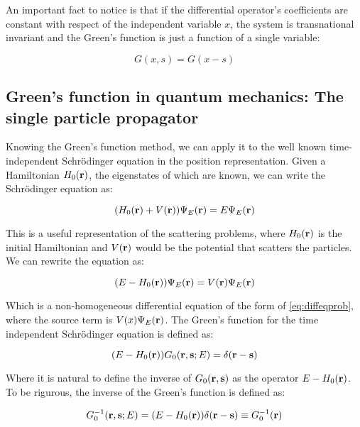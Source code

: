 An important fact to notice is that if the differential operator's coefficients are constant with respect of the independent variable $x$, the system is transnational invariant and the Green's function is just a function of a single variable:

\begin{equation}
    G(x,s)=G(x-s)
\end{equation}

\subsection{Green's function in quantum mechanics: The single particle propagator}

Knowing the Green's function method, we can apply it to the well known time-independent Schrödinger equation in the position representation. Given a Hamiltonian $H_0(\vb r)$, the eigenstates of which are known, we can write the Schrödinger equation as:

\begin{equation}
    \qty(H_0(\vb r)+V(\vb r)){\Psi_E(\vb r)}=E{\Psi_E(\vb r)}
\end{equation}

This is a useful representation of the scattering problems, where $H_0(\vb r)$ is the initial Hamiltonian and $V(\vb r)$ would be the potential that scatters the particles. We can rewrite the equation as:

\begin{equation}
    \qty(E-H_0(\vb r)){\Psi_E(\vb r)}=V(\vb r){\Psi_E(\vb r)}
\end{equation}

Which is a non-homogeneous differential equation of the form of \cref{eq:diffeqprob}, where the source term is $V(x){\Psi_E(\vb r)}$. The Green's function for the time independent Schrödinger equation is defined as:

\begin{equation}
    \qty(E-H_0(\vb r))G_0(\vb r,\vb s;E)=\delta(\vb r-\vb s)
\end{equation}

Where it is natural to define the inverse of $G_0(\vb r,\vb s)$ as the operator $E-H_0(\vb r)$. To be rigurous, the inverse of the Green's function is defined as:

\begin{equation}
    G_0^{-1}(\vb r,\vb s;E)=\qty(E-H_0(\vb r))\delta(\vb r-\vb s)\equiv G_0^{-1}(\vb r)
\end{equation}

